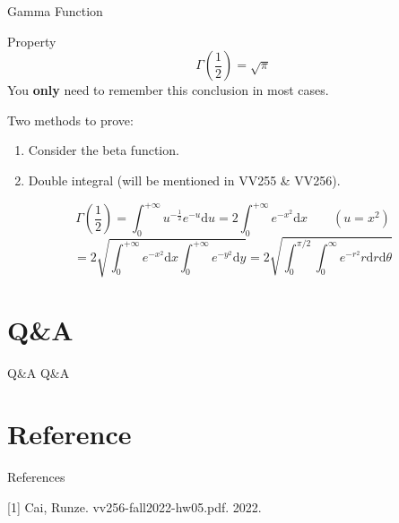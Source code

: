 \documentclass[
	11pt, %
]{beamer}
\begin{document}
\begin{frame}{Gamma Function}
\begin{block}{Property}
    \begin{equation*}
        \Gamma(\frac{1}{2})=\sqrt{\pi}
    \end{equation*}
    You \textbf{only} need to remember this conclusion in most cases.
\end{block}

Two methods to prove:
\begin{enumerate}
    \item Consider the beta function.
    \item Double integral (will be mentioned in VV255 \& VV256).
\end{enumerate}
\begin{equation*}
    \Gamma(\frac{1}{2})=\int_0^{+\infty}u^{-\frac{1}{2}}e^{-u}\mathrm{d}u=2\int_0^{+\infty}e^{-x^2}\mathrm{d}x \qquad (u=x^2)
\end{equation*}
\begin{equation*}
    =2\sqrt{\int_0^{+\infty}e^{-x^2}\mathrm{d}x\int_0^{+\infty}e^{-y^2}\mathrm{d}y}=2\sqrt{\int_0^{\pi/2}\int_0^\infty e^{-r^2}r\mathrm{d}r\mathrm{d}\theta}
\end{equation*}

\end{frame}





\section{Q\&A}
\begin{frame}
    \transfade
	\tableofcontents[sectionstyle=show/shaded,subsectionstyle=show/shaded]
\end{frame}


\begin{frame}{Q\&A}
\centering
\Huge Q\&A
\end{frame}

\section{Reference}
\begin{frame}
    \transfade
	\tableofcontents[sectionstyle=show/shaded,subsectionstyle=show/shaded]
\end{frame}

\begin{frame}{References}

	[1] Cai, Runze. vv256-fall2022-hw05.pdf. 2022.\\
	
\end{frame}

\end{document}
